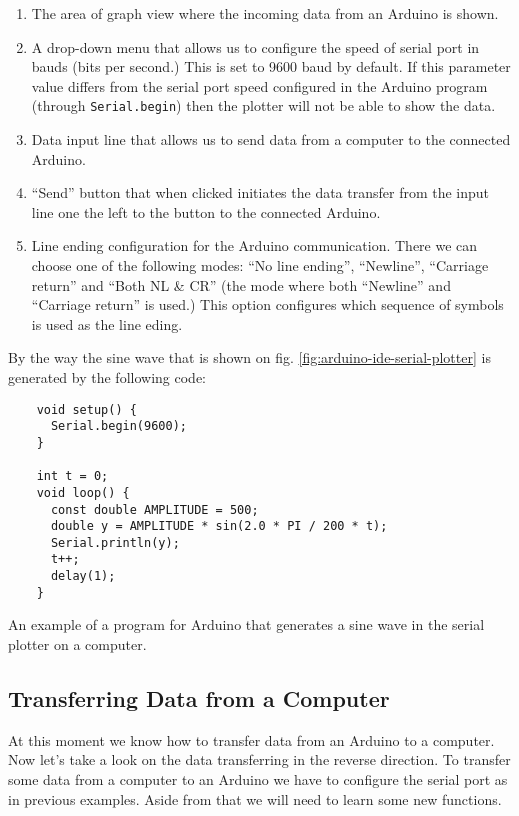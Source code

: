 \documentclass[../sparc.tex]{subfiles}
\begin{document}
\begin{enumerate}
\item The area of graph view where the incoming data from an Arduino is shown.
\item A drop-down menu that allows us to configure the speed of serial port in
  bauds (bits per second.)  This is set to 9600 baud by default.  If this
  parameter value differs from the serial port speed configured in the Arduino
  program (through \texttt{Serial.begin}) then the plotter will not be able to
  show the data.
\item Data input line that allows us to send data from a computer to the
  connected Arduino.
\item ``Send'' button that when clicked initiates the data transfer from the
  input line one the left to the button to the connected Arduino.
\item Line ending configuration for the Arduino communication.  There we can
  choose one of the following modes: ``No line ending'', ``Newline'', ``Carriage
  return'' and ``Both NL \& CR'' (the mode where both ``Newline'' and ``Carriage
  return'' is used.)  This option configures which sequence of symbols is used
  as the line eding.
\end{enumerate}

\newpage

By the way the sine wave that is shown on fig.
\ref{fig:arduino-ide-serial-plotter} is generated by the following code:

\begin{listing}[ht]
  \begin{verbatim}
    void setup() {
      Serial.begin(9600);
    }

    int t = 0;
    void loop() {
      const double AMPLITUDE = 500;
      double y = AMPLITUDE * sin(2.0 * PI / 200 * t);
      Serial.println(y);
      t++;
      delay(1);
    }
  \end{verbatim}
  \label{listing:serial-port-sine-wave-example}
  \caption{An example of a program for Arduino that generates a sine wave in the
    serial plotter on a computer.}
\end{listing}

\subsection{Transferring Data from a Computer}

At this moment we know how to transfer data from an Arduino to a computer. Now
let's take a look on the data transferring in the reverse direction. To transfer
some data from a computer to an Arduino we have to configure the serial port as
in previous examples.  Aside from that we will need to learn some new functions.
\end{document}
